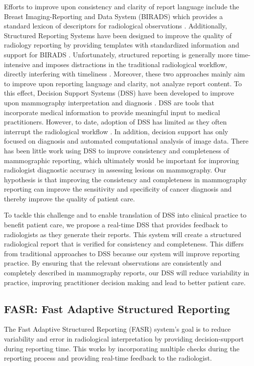 Efforts to improve upon consistency and clarity of report language include the Breast Imaging-Reporting and Data System (BIRADS) which provides a standard lexicon of descriptors for radiological observations \cite{Liberman:ws}. Additionally, Structured Reporting Systems have been designed to improve the quality of radiology reporting by providing templates with standardized information and support for BIRADS \cite{Reiner:2009ib}. Unfortunately, structured reporting is generally more time-intensive and imposes distractions in the traditional radiological workflow, directly interfering with timeliness \cite{Weiss:2008er}. Moreover, these two approaches mainly aim to improve upon reporting language and clarity, not analyze report content. To this effect, Decision Support Systems (DSS) have been developed to improve upon mammography interpretation and diagnosis \cite{Garg:2005cb, Burnside:2000wl, ElizabethS:2005gc, Rubin:2005jg}. DSS are tools that incorporate medical information to provide meaningful input to medical practitioners. However, to date, adoption of DSS has limited as they often interrupt the radiological workflow \cite{Morgan:2011ct}. In addition, decision support has only focused on diagnosis and automated computational analysis of image data. There has been little work using DSS to improve consistency and completeness of mammographic reporting, which ultimately would be important for improving radiologist diagnostic accuracy in assessing lesions on mammography. Our hypothesis is that improving the consistency and completeness in mammography reporting can improve the sensitivity and specificity of cancer diagnosis and thereby improve the quality of patient care.

To tackle this challenge and to enable translation of DSS into clinical practice to benefit patient care, we propose a real-time DSS that provides feedback to radiologists as they generate their reports. This system will create a structured radiological report that is verified for consistency and completeness. This differs from traditional approaches to DSS because our system will improve reporting practice. By ensuring that the relevant observations are consistently and completely described in mammography reports, our DSS will reduce variability in practice, improving practitioner decision making and lead to better patient care.

\subsection{FASR: Fast Adaptive Structured Reporting}
The Fast Adaptive Structured Reporting (FASR) system's goal is to reduce variability and error in radiological interpretation by providing decision-support during reporting time. This works by incorporating multiple checks during the reporting process and providing real-time feedback to the radiologist.

